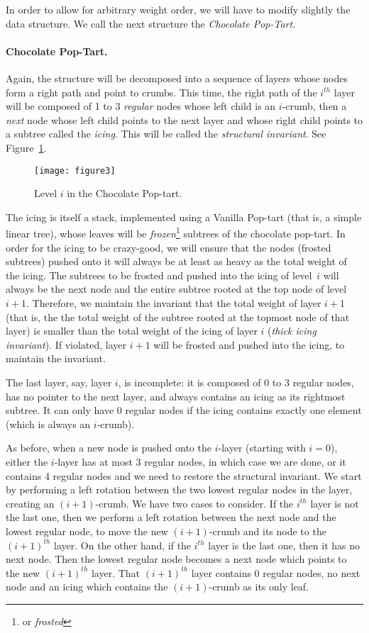 \documentclass[11pt]{article}
\begin{document}
In order to allow for arbitrary weight order, we will have to modify
slightly the data structure. We call the next structure the
\emph{Chocolate Pop-Tart}.

\paragraph{Chocolate Pop-Tart.}
Again, the structure will be decomposed into a sequence of layers whose
nodes form a right path and point to crumbs. This time, the right path
of the $i^{th}$ layer will be composed of 1 to 3 \emph{regular} nodes
whose left child is an $i$-crumb, then a \emph{next} node whose left
child points to the next layer and whose right child points to a subtree
called the \emph{icing}. This will be called the \emph{structural invariant}.  See Figure~\ref{fig:chocoloate-pop-tart}.
\begin{figure}
\begin{center}
\texttt{[image: figure3]} 
\end{center}
\caption{Level $i$ in the Chocolate Pop-tart.}
\label{fig:chocoloate-pop-tart}
\end{figure} 
The icing is itself a stack, implemented using a Vanilla Pop-tart (that
is, a simple linear tree), whose leaves will be
\emph{frozen}\footnote{or \emph{frosted}} subtrees of the chocolate
pop-tart. In order for the icing to be crazy-good, we will ensure that
the nodes (frosted subtrees) pushed onto it will always be at least as
heavy as the total weight of the icing.  The subtrees to be frosted and
pushed into the icing of level~$i$ will always be the next node and the
entire subtree rooted at the top node of level $i+1$.  Therefore, we
maintain the invariant that the total weight of layer $i+1$ (that is,
the the total weight of the subtree rooted at the topmost node of that
layer) is smaller than the total weight of the icing of layer $i$
(\emph{thick icing invariant}). If
violated, layer $i+1$ will be frosted and pushed into the icing, to
maintain the invariant.

The last layer, say, layer $i$, is incomplete: it is composed of 0 to 3
regular nodes, has no pointer to the next layer, and always contains an
icing as its rightmost subtree. It can only have 0 regular nodes if the
icing contains exactly one element (which is always an $i$-crumb).

As before, when a new node is pushed onto the $i$-layer (starting with
$i=0$), 
either the $i$-layer has at most 3 regular nodes, in which case we are
done, or it contains 4 regular nodes and we need to restore the structural
invariant.  We start by performing a left rotation between the two
lowest regular nodes in the layer, creating an $(i+1)$-crumb.  We have
two cases to consider. If the $i^{th}$ layer is not the last one, then
we perform a left rotation between the next node and the lowest regular
node, to move the new $(i+1)$-crumb and its node to the $(i+1)^{th}$
layer.  On the other hand, if the $i^{th}$ layer is the last one, then
it has no next node. Then the lowest regular node becomes a next node
which points to the new $(i+1)^{th}$ layer. That $(i+1)^{th}$ layer
contains 0 regular nodes, no next node and an icing which contains the
$(i+1)$-crumb as its only leaf.
\end{document}
